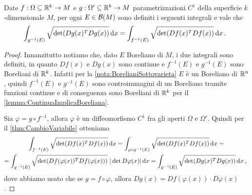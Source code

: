 \begin{lemma}\label{lemma:InvarianzaImmersione}
	Date $f:\Omega\subseteq\mathbb R^k\to M$ e $g:\Omega'\subseteq\mathbb R^k\to M$ parametrizzazioni $C^1$ della superficie $k$-dimensionale $M$, per ogni $E\in\mathcal B(M)$ sono definiti i seguenti integrali e vale che 
	\begin{equation*}
		\int_{g^{-1}(E)}\sqrt{\det(Dg(x)^TDg(x))}\,\mathrm d x=\int_{f^{-1}(E)}\sqrt{\det(Df(x)^TDf(x))}\,\mathrm d x\, \text{. }
	\end{equation*}
\end{lemma}
\begin{proof}
	Innanzitutto notiamo che, dato $E$ Boreliano di $M$, i due integrali sono definiti, in quanto $Df(x)$ e $Dg(x)$ sono continue e $f^{-1}(E)$ e $g^{-1}(E)$ sono Boreliani di $\mathbb R^k$. Infatti per la \cref{nota:BorelianiSottovarieta} $E$ è un Boreliano di $\mathbb R^n$, quindi $f^{-1}(E)$ e $g^{-1}(E)$ sono controimmagini di un Boreliano tramite funzioni continue e di conseguenza sono Boreliani di $\mathbb R^k$ per il \cref{lemma:ContinuaImplicaBoreliana}.

	Sia $\varphi=g\circ f^{-1}$, allora $\varphi$ è un diffeomorfismo $C^1$ fra gli aperti $\Omega$ e $\Omega'$. Quindi per il \cref{thm:CambioVariabile} otteniamo
	\begin{multline*}
		\int_{f^{-1}(E)}\sqrt{\det(Df(x)^TDf(x))}\de x=\int_{\varphi\circ g^{-1}(E)}\sqrt{\det(Df(x)^TDf(x))}\de x=\\
		=\int_{g^{-1}(E)}\sqrt{\det(Df(\varphi(x))^TDf(\varphi(x)))}\ |\det D\varphi(x)|\de x=\int_{g^{-1}(E)}\sqrt{\det(Dg(x)^TDg(x))}\de x\virgola
	\end{multline*}
	dove abbiamo usato che se $g=f\circ \varphi$, allora $Dg(x)=Df(\varphi(x))\cdot D\varphi(x)$.
\end{proof}

